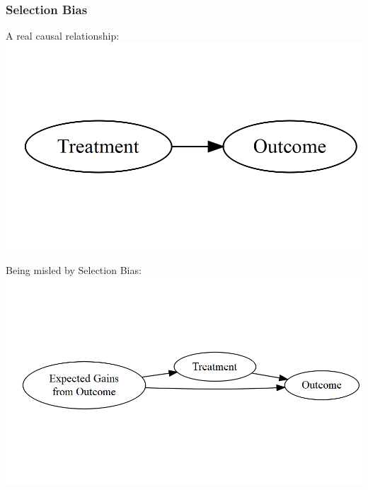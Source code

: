 \documentclass[xcolor=x11names,compress]{beamer}\usepackage[]{graphicx}\usepackage[]{color}
\makeatletter
\def\maxwidth{ %
  \ifdim\Gin@nat@width>\linewidth
    \linewidth
  \else
    \Gin@nat@width
  \fi
}
\newenvironment{knitrout}{}{} %
\renewcommand{\(}{\begin{columns}}
\renewcommand{\)}{\end{columns}}
\newcommand{\<}[1]{\begin{column}{#1}}
\renewcommand{\>}{\end{column}}
\makeatother
\begin{document}
\begin{frame}
\frametitle{Selection Bias}
\begin{multicols}{2}
A real causal relationship:
\begin{knitrout}
\color{fgcolor}
\includegraphics[width=\maxwidth]{figure/explanation7-1} 

\end{knitrout}
\columnbreak
Being misled by Selection Bias:
\begin{knitrout}
\color{fgcolor}
\includegraphics[width=\maxwidth]{figure/explanation8-1} 

\end{knitrout}
\end{multicols}
\end{frame}
\end{document}
